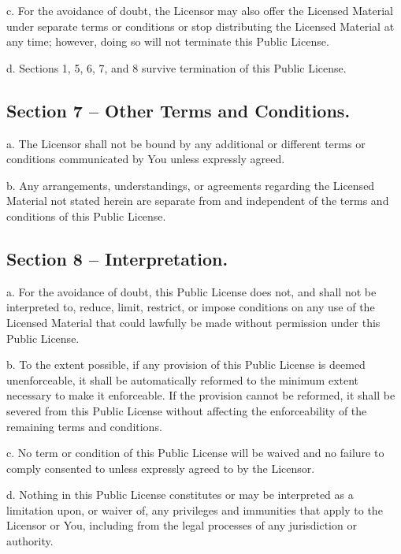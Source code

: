 c. For the avoidance of doubt, the Licensor may also offer the Licensed Material under separate terms or conditions or stop distributing the Licensed Material at any time; however, doing so will not terminate this Public License.

d. Sections 1, 5, 6, 7, and 8 survive termination of this Public License.

\subsection*{Section 7 -- Other Terms and Conditions.}

a. The Licensor shall not be bound by any additional or different terms or conditions communicated by You unless expressly agreed.

b. Any arrangements, understandings, or agreements regarding the Licensed Material not stated herein are separate from and independent of the terms and conditions of this Public License.

\subsection*{Section 8 -- Interpretation.}

a. For the avoidance of doubt, this Public License does not, and shall not be interpreted to, reduce, limit, restrict, or impose conditions on any use of the Licensed Material that could lawfully be made without permission under this Public License.

b. To the extent possible, if any provision of this Public License is deemed unenforceable, it shall be automatically reformed to the minimum extent necessary to make it enforceable. If the provision cannot be reformed, it shall be severed from this Public License without affecting the enforceability of the remaining terms and conditions.

c. No term or condition of this Public License will be waived and no failure to comply consented to unless expressly agreed to by the Licensor.

d. Nothing in this Public License constitutes or may be interpreted as a limitation upon, or waiver of, any privileges and immunities that apply to the Licensor or You, including from the legal processes of any jurisdiction or authority.





